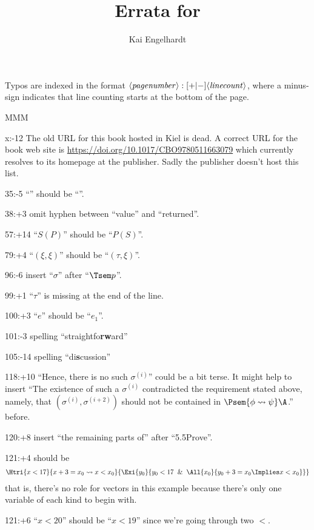 \documentclass[11pt,smallheadings,parskip]{scrartcl}
\title{Errata for \citep{EdR:cup98}}
\author{Kai Engelhardt}
\begin{document}
\maketitle
Typos are indexed in the format
$\langle\text{\textit{pagenumber}}\rangle:[+|-]\langle\text{\textit{linecount}}\rangle$,
where a minus-sign indicates that line counting starts at the bottom
of the page.

\begin{deflist}{MMM}
\item[x:-12] The old URL for this book hosted in Kiel is dead. A correct URL for the book web site is \url{https://doi.org/10.1017/CBO9780511663079} which currently resolves to its homepage at the publisher. Sadly the publisher doesn't host this list.
\item[35:-5] ``'' should be ``\cons''.
\item[38:+3] omit hyphen between ``value'' and ``returned''.
\item[57:+14] ``$S(P)$'' should be ``$P(S)$''.
\item[79:+4] ``$(\xi,\xi)$'' should be ``$(\tau,\xi)$''.
\item[96:-6] insert ``$\sigma$'' after ``$\Tsem p$''.
\item[99:+1] ``$\tau$'' is missing at the end of the line.
\item[100:+3] ``$e$'' should be ``$e_1$''.
\item[101:-3] spelling ``straightfo\textbf{rw}ard''
\item[105:-14] spelling ``di\textbf{s}cussion''
\item[118:+10]  ``Hence, there is no such $\sigma^{(i)}$'' could be a bit terse. It might help to insert ``The existence of such a $\sigma^{(i)}$ contradicted the requirement stated above, namely, that $(\sigma^{(i)},\sigma^{(i+2)})$ should not be contained in $\Psem{\phi\leadsto\psi}\A$.'' before.
\item[120:+8] insert ``the remaining parts of'' after ``5.5\quad Prove''.
\item[121:+4] should be
  \begin{gather*}
    \Htri{x<17}{x+3=x_0 \leadsto x<x_0}{%
      \Exi{y_0}{%
        y_0<17 \And \All{x_0}{%
          y_0+3=x_0 \Implies x<x_0}}}
  \end{gather*}
  that is, there's no role for vectors in this example because there's
  only one variable of each kind to begin with.
\item[121:+6] ``$x<20$'' should be ``$x<19$'' since we're going through two $<$.

\end{deflist}
\end{document}
